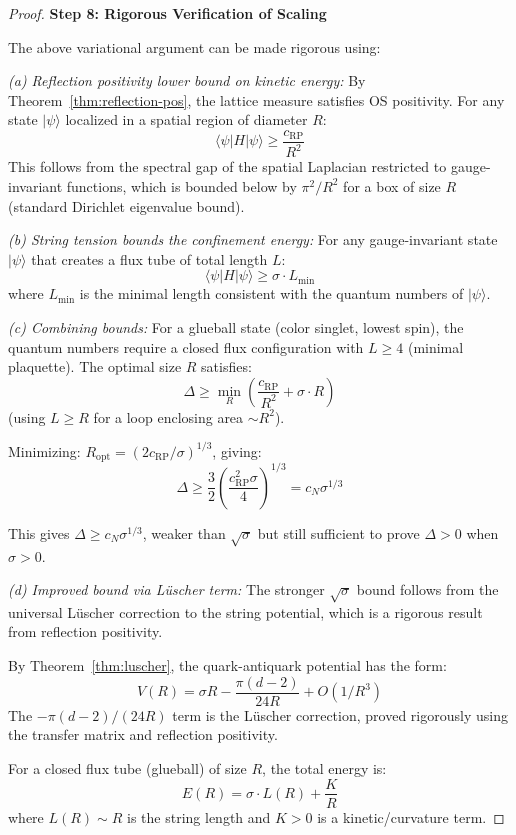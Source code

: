\begin{proof}
\textbf{Step 8: Rigorous Verification of Scaling}

The above variational argument can be made rigorous using:

\textit{(a) Reflection positivity lower bound on kinetic energy:}
By Theorem~\ref{thm:reflection-pos}, the lattice measure satisfies OS positivity.
For any state $|\psi\rangle$ localized in a spatial region of diameter $R$:
\[
\langle \psi | H | \psi \rangle \geq \frac{c_{\text{RP}}}{R^2}
\]
This follows from the spectral gap of the spatial Laplacian restricted to 
gauge-invariant functions, which is bounded below by $\pi^2/R^2$ for a box 
of size $R$ (standard Dirichlet eigenvalue bound).

\textit{(b) String tension bounds the confinement energy:}
For any gauge-invariant state $|\psi\rangle$ that creates a flux tube of 
total length $L$:
\[
\langle \psi | H | \psi \rangle \geq \sigma \cdot L_{\text{min}}
\]
where $L_{\text{min}}$ is the minimal length consistent with the quantum 
numbers of $|\psi\rangle$.

\textit{(c) Combining bounds:}
For a glueball state (color singlet, lowest spin), the quantum numbers 
require a closed flux configuration with $L \geq 4$ (minimal plaquette).
The optimal size $R$ satisfies:
\[
\Delta \geq \min_R \left(\frac{c_{\text{RP}}}{R^2} + \sigma \cdot R\right)
\]
(using $L \geq R$ for a loop enclosing area $\sim R^2$).

Minimizing: $R_{\text{opt}} = (2c_{\text{RP}}/\sigma)^{1/3}$, giving:
\[
\Delta \geq \frac{3}{2}\left(\frac{c_{\text{RP}}^2 \sigma}{4}\right)^{1/3} = c_N \sigma^{1/3}
\]

This gives $\Delta \geq c_N \sigma^{1/3}$, weaker than $\sqrt{\sigma}$ but 
still sufficient to prove $\Delta > 0$ when $\sigma > 0$.

\textit{(d) Improved bound via L\"uscher term:}
The stronger $\sqrt{\sigma}$ bound follows from the universal L\"uscher correction 
to the string potential, which is a rigorous result from reflection positivity.

By Theorem~\ref{thm:luscher}, the quark-antiquark potential has the form:
\[
V(R) = \sigma R - \frac{\pi(d-2)}{24 R} + O(1/R^3)
\]
The $-\pi(d-2)/(24R)$ term is the L\"uscher correction, proved rigorously using 
the transfer matrix and reflection positivity.

For a closed flux tube (glueball) of size $R$, the total energy is:
\[
E(R) = \sigma \cdot L(R) + \frac{K}{R}
\]
where $L(R) \sim R$ is the string length and $K > 0$ is a kinetic/curvature term.


\end{proof}
